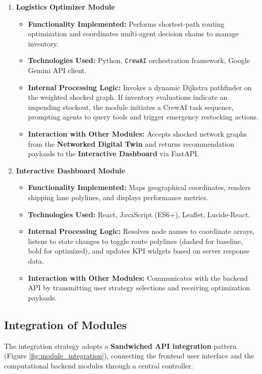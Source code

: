 \begin{enumerate}[label=\Roman*.]
    \item \textbf{Logistics Optimizer Module}
    \begin{itemize}
        \item \textbf{Functionality Implemented:} Performs shortest-path routing optimization and coordinates multi-agent decision chains to manage inventory.
        \item \textbf{Technologies Used:} Python, \texttt{CrewAI} orchestration framework, Google Gemini API client.
        \item \textbf{Internal Processing Logic:} Invokes a dynamic Dijkstra pathfinder on the weighted shocked graph. If inventory evaluations indicate an impending stockout, the module initiates a CrewAI task sequence, prompting agents to query tools and trigger emergency restocking actions.
        \item \textbf{Interaction with Other Modules:} Accepts shocked network graphs from the \textbf{Networked Digital Twin} and returns recommendation payloads to the \textbf{Interactive Dashboard} via FastAPI.
    \end{itemize}

    \item \textbf{Interactive Dashboard Module}
    \begin{itemize}
        \item \textbf{Functionality Implemented:} Maps geographical coordinates, renders shipping lane polylines, and displays performance metrics.
        \item \textbf{Technologies Used:} React, JavaScript (ES6+), Leaflet, Lucide-React.
        \item \textbf{Internal Processing Logic:} Resolves node names to coordinate arrays, listens to state changes to toggle route polylines (dashed for baseline, bold for optimized), and updates KPI widgets based on server response data.
        \item \textbf{Interaction with Other Modules:} Communicates with the backend API by transmitting user strategy selections and receiving optimization payloads.
    \end{itemize}
\end{enumerate}

\subsection[Integration of Modules]{Integration of Modules}
The integration strategy adopts a \textbf{Sandwiched API integration} pattern (Figure \ref{fig:module_integration}), connecting the frontend user interface and the computational backend modules through a central controller.

